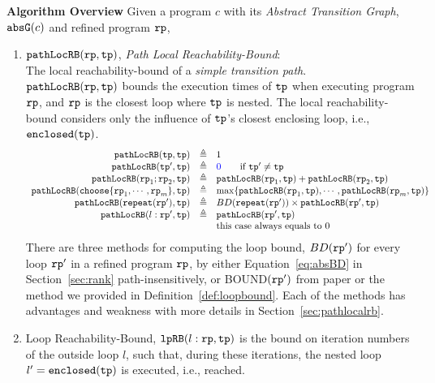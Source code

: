 \textbf{Algorithm Overview} 
Given a program $c$ with its \emph{Abstract Transition Graph}, $\mathtt{abs}{\mathtt{G}}(c)$ and refined program $\mathtt{rp}$,
\begin{enumerate}
  \item $\mathtt{pathLocRB}(\mathtt{rp}, \mathtt{tp})$, \emph{Path Local Reachability-Bound}:
      \\
      The local reachability-bound of a \emph{simple transition path}. 
      \\
      $\mathtt{pathLocRB}(\mathtt{rp}, \mathtt{tp})$ bounds the execution times of $\mathtt{tp}$ when executing program $\mathtt{rp}$,
      and $\mathtt{rp}$ is the closest loop where $\mathtt{tp}$ is nested.
      The local reachability-bound  considers only the influence of $\mathtt{tp}$'s closest enclosing loop, i.e., $\mathtt{enclosed}(\mathtt{tp})$.
      \[
        \begin{array}{rcl}
        \outinB(\tpath, \tpath) & \triangleq & 1 \\
        \outinB(\tpath', \tpath) & \triangleq & \highlight{0} \qquad \text{if } \tpath' \neq \tpath\\
        \outinB(\rprog_1;\rprog_2, \tpath) & \triangleq & \outinB(\rprog_1, \tpath) + \outinB(\rprog_2, \tpath) \\
        \outinB(\rpchoose{\rprog_1, \cdots, \rprog_m }, \tpath) & \triangleq 
        & \max\left\{ \outinB(\rprog_1, \tpath), \cdots, \outinB(\rprog_m, \tpath) \right\} \\
        \outinB(\rprepeat(\rprog'), \tpath) & \triangleq 
        & BD(\rprepeat(\rprog'))
        \times \outinB(\rprog', \tpath)
        \\
        \outinB(l: \rprog', \tpath) & \triangleq & \outinB(\rprog', \tpath) \\
        &  & \text{this case always equals to } 0 \\
        \end{array}
      \]
      There are three methods for computing the loop bound, $BD(\mathtt{rp}')$ for every loop $\mathtt{rp}'$ in a refined program $\mathtt{rp}$, by either Equation~\ref{eq:absBD} in Section~\ref{sec:rank} path-insensitively, or BOUND$(\mathtt{rp}')$ from paper\cite{GulwaniJK09} or the method we provided in Definition~\ref{def:loopbound}.
      Each of the methods has advantages and weakness with more details in Section~\ref{sec:pathlocalrb}.
  \item 
      {Loop Reachability-Bound},
      $\mathtt{lpRB}(l: \mathtt{rp}, \mathtt{tp})$
      is the bound on iteration numbers of the outside loop $l$,
      such that,
      during these iterations, the nested loop $l' = \mathtt{enclosed(\mathtt{tp})}$ is executed, i.e., reached.

\end{enumerate}
